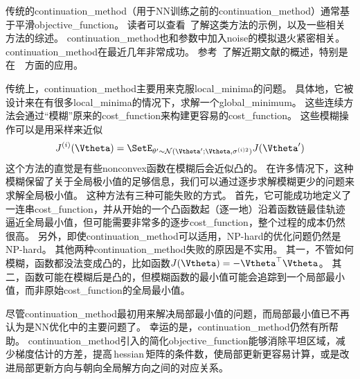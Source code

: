 传统的\gls{continuation_method}（用于\gls{NN}训练之前的\gls{continuation_method}）通常基于平滑\gls{objective_function}。
读者可以查看~\cite{Wu-1997}了解这类方法的示例，以及一些相关方法的综述。
\gls{continuation_method}也和参数中加入\gls{noise}的模拟退火紧密相关\citep{Kirkpatrick-et-al-1983}。
\gls{continuation_method}在最近几年非常成功。
参考~\cite{Mobahi-Fisher-2015}了解近期文献的概述，特别是在~~方面的应用。


传统上，\gls{continuation_method}主要用来克服\gls{local_minima}的问题。
具体地，它被设计来在有很多\gls{local_minima}的情况下，求解一个\gls{global_minimum}。
这些连续方法会通过``模糊''原来的\gls{cost_function}来构建更容易的\gls{cost_function}。
这些模糊操作可以是用采样来近似
\begin{equation}
    J^{(i)}(\Vtheta) = \SetE_{\theta' \sim \mathcal{N}(\Vtheta'; \Vtheta, \sigma^{(i)2})} J(\Vtheta')
\end{equation}
这个方法的直觉是有些\gls{nonconvex}函数在模糊后会近似凸的。
在许多情况下，这种模糊保留了关于全局极小值的足够信息，我们可以通过逐步求解模糊更少的问题来求解全局极小值。
这种方法有三种可能失败的方式。
首先，它可能成功地定义了一连串\gls{cost_function}，并从开始的一个凸函数起（逐一地）沿着函数链最佳轨迹逼近全局最小值，但可能需要非常多的逐步\gls{cost_function}，整个过程的成本仍然很高。
另外，即使\gls{continuation_method}可以适用，NP-hard的优化问题仍然是NP-hard。
其他两种\gls{continuation_method}失败的原因是不实用。
其一，不管如何模糊，函数都没法变成凸的，比如函数$J(\Vtheta) = -\Vtheta^\top \Vtheta$。
其二，函数可能在模糊后是凸的，但模糊函数的最小值可能会追踪到一个局部最小值，而非原始\gls{cost_function}的全局最小值。


尽管\gls{continuation_method}最初用来解决局部最小值的问题，而局部最小值已不再认为是\gls{NN}优化中的主要问题了。
幸运的是，\gls{continuation_method}仍然有所帮助。
\gls{continuation_method}引入的简化\gls{objective_function}能够消除平坦区域，减少梯度估计的方差，提高\,\gls{hessian}\,矩阵的条件数，使局部更新更容易计算，或是改进局部更新方向与朝向全局解方向之间的对应关系。

